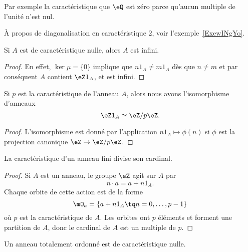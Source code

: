 Par exemple la caractéristique que \( \eQ\) est zéro parce qu'aucun multiple de l'unité n'est nul.

À propos de diagonalisation en caractéristique \( 2\), voir l'exemple~\ref{ExewINgYo}.

\begin{lemma}
    Si \( A\) est de caractéristique nulle, alors \( A\) est infini.
\end{lemma}

\begin{proof}
    En effet, \( \ker\mu=\{0\} \) implique que \( n1_A \neq  m1_A\) dès que \(n \neq m \) et par conséquent \( A\) contient \(\eZ 1_A \), et  est infini.
\end{proof}

\begin{lemma}       \label{LemHmDaYH}
    Si \( p\) est la caractéristique de l'anneau \( A\), alors nous avons l'isomorphisme d'anneaux
    \begin{equation}
         \eZ 1_A\simeq\eZ/p\eZ.
    \end{equation}
\end{lemma}

\begin{proof}
    L'isomorphisme est donné par l'application \( n1_A\mapsto \phi(n)\) si \( \phi\) est la projection canonique \( \eZ\to \eZ/p\eZ\).
\end{proof}

\begin{proposition}     \label{PropGExaUK}
    La caractéristique d'un anneau fini divise son cardinal.
\end{proposition}

\begin{proof}
    Si \( A\) est un anneau, le groupe \( \eZ\) agit sur \( A\) par
    \begin{equation}
        n\cdot a=a+n1_A.
    \end{equation}
    Chaque orbite de cette action est de la forme
    \begin{equation}
        \mO_a=\{ a+n1_A\tq n=0,\ldots, p-1 \}
    \end{equation}
    où \( p\) est la caractéristique de \( A\). Les orbites ont \( p\) éléments et forment une partition de \( A\), donc le cardinal de \( A\) est un multiple de \( p\).
\end{proof}

\begin{lemma}        \label{LEMooJQIKooQgukqn}
    Un anneau totalement ordonné est de caractéristique nulle.
\end{lemma}

